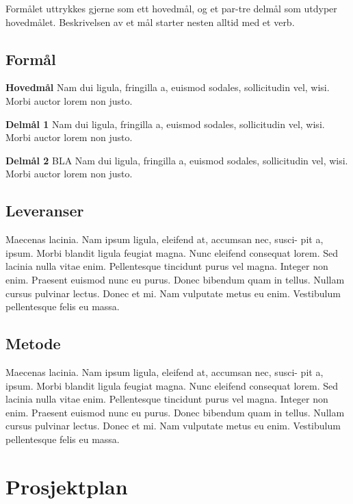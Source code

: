 \documentclass[11pt,a4paper]{report}
\begin{document}
Formålet uttrykkes gjerne som ett hovedmål, og et par-tre delmål som utdyper hovedmålet. Beskrivelsen av et mål starter nesten alltid med et verb.


\subsection*{Formål}

\begin{compactitem}
\item [{\bf Hovedmål}] Nam dui ligula, fringilla a, euismod sodales, sollicitudin vel, wisi. Morbi
auctor lorem non justo.
\begin{compactitem}
\item [{\bf  Delmål 1} ] Nam dui ligula, fringilla a, euismod sodales, sollicitudin vel, wisi. Morbi
auctor lorem non justo.
\item [{\bf  Delmål 2} ] BLA Nam dui ligula, fringilla a, euismod sodales, sollicitudin vel, wisi. Morbi
auctor lorem non justo.
\end{compactitem}
\end{compactitem}

\subsection*{Leveranser}

Maecenas lacinia. Nam ipsum ligula, eleifend at, accumsan nec, susci- pit a, ipsum. Morbi blandit ligula feugiat magna. Nunc eleifend consequat lorem. Sed lacinia nulla vitae enim. Pellentesque tincidunt purus vel magna. Integer non enim. Praesent euismod nunc eu purus. Donec bibendum quam in tellus. Nullam cursus pulvinar lectus. Donec et mi. Nam vulputate metus eu enim. Vestibulum pellentesque felis eu massa.

\subsection*{Metode}
Maecenas lacinia. Nam ipsum ligula, eleifend at, accumsan nec, susci- pit a, ipsum. Morbi blandit ligula feugiat magna. Nunc eleifend consequat lorem. Sed lacinia nulla vitae enim. Pellentesque tincidunt purus vel magna. Integer non enim. Praesent euismod nunc eu purus. Donec bibendum quam in tellus. Nullam cursus pulvinar lectus. Donec et mi. Nam vulputate metus eu enim. Vestibulum pellentesque felis eu massa.


\section*{Prosjektplan}
\end{document}
